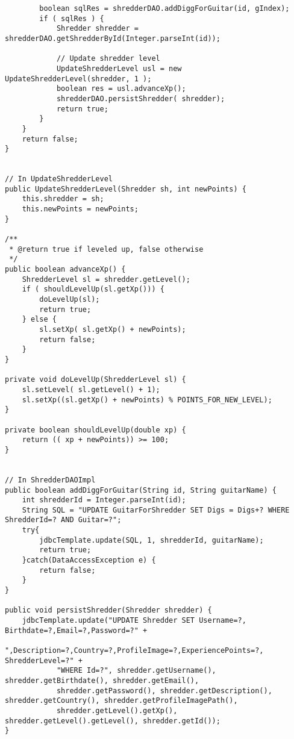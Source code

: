 \begin{lstlisting}
		boolean sqlRes = shredderDAO.addDiggForGuitar(id, gIndex);
		if ( sqlRes ) {
			Shredder shredder = shredderDAO.getShredderById(Integer.parseInt(id));
		
			// Update shredder level
			UpdateShredderLevel usl = new UpdateShredderLevel(shredder, 1 );
			boolean res = usl.advanceXp();			
			shredderDAO.persistShredder( shredder);
			return true;
		}
	}
	return false;
}


// In UpdateShredderLevel
public UpdateShredderLevel(Shredder sh, int newPoints) {
	this.shredder = sh;
	this.newPoints = newPoints;
}
	
/** 
 * @return true if leveled up, false otherwise
 */
public boolean advanceXp() {
	ShredderLevel sl = shredder.getLevel();
	if ( shouldLevelUp(sl.getXp())) {
		doLevelUp(sl);
		return true;
	} else {
		sl.setXp( sl.getXp() + newPoints);
		return false;
	}		
}

private void doLevelUp(ShredderLevel sl) {
	sl.setLevel( sl.getLevel() + 1);
	sl.setXp((sl.getXp() + newPoints) % POINTS_FOR_NEW_LEVEL);		
}

private boolean shouldLevelUp(double xp) {
	return (( xp + newPoints)) >= 100;
}


// In ShredderDAOImpl
public boolean addDiggForGuitar(String id, String guitarName) {
	int shredderId = Integer.parseInt(id);
	String SQL = "UPDATE GuitarForShredder SET Digs = Digs+? WHERE ShredderId=? AND Guitar=?";
	try{
		jdbcTemplate.update(SQL, 1, shredderId, guitarName);
		return true;
	}catch(DataAccessException e) {
		return false;
	}
}

public void persistShredder(Shredder shredder) {
	jdbcTemplate.update("UPDATE Shredder SET Username=?, Birthdate=?,Email=?,Password=?" +
			",Description=?,Country=?,ProfileImage=?,ExperiencePoints=?, ShredderLevel=?" +
			"WHERE Id=?", shredder.getUsername(), shredder.getBirthdate(), shredder.getEmail(),
			shredder.getPassword(), shredder.getDescription(), shredder.getCountry(), shredder.getProfileImagePath(),
			shredder.getLevel().getXp(), shredder.getLevel().getLevel(), shredder.getId());
}
\end{lstlisting}
